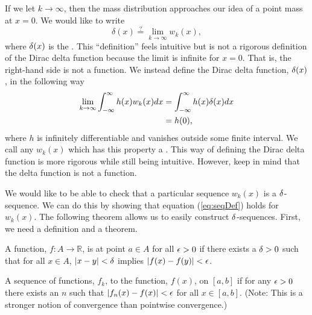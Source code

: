 If we let \(k \rightarrow \infty\), then the mass distribution approaches our idea of a point mass at \(x=0\). We would like to write
\begin{equation} \label{eq:deltaSeqLim}
    \delta(x) \overset{?}{=} \lim_{k\rightarrow \infty} w_k(x),
\end{equation}
where \(\delta(x)\) is the . This ``definition'' feels intuitive but is not a rigorous definition of the Dirac delta function because the limit is infinite for \(x=0\). That is, the right-hand side is not a function. We instead define the Dirac delta function, \(\delta(x)\), in the following way
\begin{equation}\label{eq:seqDef}
    \begin{split}
        \lim_{k\rightarrow \infty}\int_{-\infty}^{\infty} h(x)w_k(x)dx &= \int_{-\infty}^{\infty} h(x)\delta(x)dx \\
        &= h(0),
    \end{split}
\end{equation}
where \(h\) is infinitely differentiable and vanishes outside some finite interval. We call any \(w_k(x)\) which has this property a .  This way of defining the Dirac delta function is more rigorous while still being intuitive. However, keep in mind that the delta function is not a function. 

We would like to be able to check that a particular sequence \(w_k(x)\) is a \(\delta\)-sequence. We can do this by showing that equation (\ref{eq:seqDef}) holds for \(w_k(x)\). The following theorem allows us to easily construct \(\delta\)-sequences. First, we need a definition and a theorem.


\begin{definition}
    A function, \(f: A \to \mathbb{R}\), is  at point \(a \in A\) for all \(\epsilon>0\) if there exists a \(\delta>0\) such that for all \(x\in A\), \(|x-y|<\delta\) implies \(|f(x)-f(y)|<\epsilon\).
\end{definition}

\begin{definition}
    A sequence of functions, \(f_k\),  to the function, \(f(x)\), on \([a,b]\) if for any \(\epsilon>0\) there exists an \(n\) such that \(|f_n(x)-f(x)|< \epsilon\) for all \(x\in[a,b]\). (Note: This is a stronger notion of convergence than pointwise convergence.)
\end{definition}

